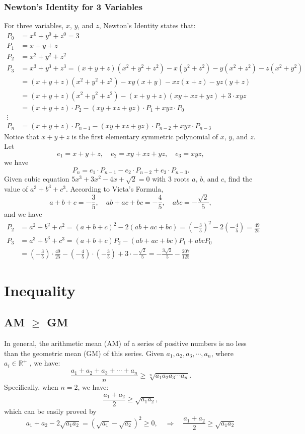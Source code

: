 \documentclass[11pt, oneside]{article}   	%
\begin{document}
\subsubsection{Newton's Identity for 3 Variables} 
For three variables, $x$, $y$, and $z$, Newton's Identity states that: 
\begin{align*}
P_0& = x^0 +y^0+z^0=3\\
P_1 &= x+y+z \\
P_2 &= x^2+y^2+z^2 \\
P_3 &= x^3+y^3+z^3 = (x+y+z)(x^2+y^2+z^2 )-x(y^2+ z^2)-y(x^2 +z^2) - z(x^2+y^2)\\
&= (x+y+z)(x^2+y^2+z^2)-xy(x+y) -xz(x+z) - yz(y+z)\\
&= (x+y+z)(x^2+y^2+z^2)- (x+y+z)(xy+xz+yz) + 3 \cdot xyz \\
&= (x+y+z) \cdot P_2 - (xy+xz+yz) \cdot P_1 + xyz \cdot P_0 \\
\vdots\\
P_n &= (x+y+z) \cdot P_{n-1} - (xy+xz+yz) \cdot P_{n-2} + xyz \cdot P_{n-3}
\end{align*}
Notice that $x+y+z$ is the first elementary symmetric polynomial of $x$, $y$, and $z$. Let 
\[ e_1 = x+y+z, \quad e_2 = xy + xz + yz,\quad  e_3 = xyz,  \]
we have 
\[ P_n= e_1\cdot P_{n-1} -e_2 \cdot P_{n-2} + e_3 \cdot P_{n-3} .\] 
Given cubic equation $5x^3+3x^2-4x+\sqrt{2}=0$ with 3 roots $a$, $b$, and $c$, find the value of $a^3+b^3+c^3$. 
According to Vieta's Formula, 
\[  a+b+c=-\frac{3}{5} , \quad ab + ac+bc= -\frac{4}{5}, \quad abc=-\frac{\sqrt{2}}{5} ,\] 
and we have 
\begin{align*}
P_2 &= a^2+b^2+c^2= (a+b+c)^2-2(ab+ac+bc)= \left(-\frac{3}{5}\right)^2-2\left(-\frac{4}{5}\right)= \frac{49}{25}\\
P_3 &= a^3+b^3+c^3 = (a+b+c)P_2 - (ab+ac+bc) P_1+abc P_0 \\
&=  \left(-\frac{3}{5}\right)\cdot \frac{49}{25} -\left(-\frac{4}{5}\right) \cdot \left(-\frac{3}{5}\right) + 3\cdot  -\frac{\sqrt{2}}{5} = -\frac{3\sqrt{2}}{5}-\frac{207}{125}
\end{align*}

\newpage 
\section{Inequality} 

\subsection{AM $\ge$ GM}
In general, the arithmetic mean (AM) of a series of positive numbers is no less than the geometric mean (GM) of this series. Given $a_1, a_2, a_3, \cdots, a_n$, where $a_i \in \mathbb{R}^+$ , we have: 
\[\frac{a_1 + a_2 + a_3 + \cdots + a_n}{n} \ge \sqrt[n]{a_1  a_2  a_3  \cdots  a_n}. \] 
Specifically, when $n=2$, we have: 
\[ \frac{a_1 + a_2}{2} \ge \sqrt{a_1  a_2}, \] 
which can be easily proved by  
\[a_1 + a_2 - 2 \sqrt{a_1 a_2} =  (\sqrt{a_1} - \sqrt{a_2})^2 \ge 0, \quad \Rightarrow \quad  \frac{a_1 + a_2}{2} \ge \sqrt{a_1  a_2} \] 
\end{document}
